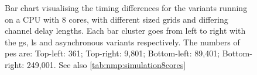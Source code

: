 \begin{figure}
    \caption[Bar chart visualising the timing differences for the variants]{Bar chart visualising the timing differences for the variants running on a CPU with 8 cores, with different sized grids and differing channel delay lengths.  Each bar cluster goes from left to right with the \gls{gs}, \gls{ls} and asynchronous variants respectively.  The numbers of \glspl{pe} are:  Top-left: 361;  Top-right:  9,801;  Bottom-left:  89,401;  Bottom-right:  249,001.  See also \autoref{tab:nmp:simulation8cores}}
    \label{fig:nmp:timings8cores}
\end{figure}

